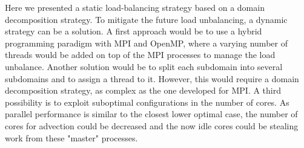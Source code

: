 Here we presented a static load-balancing strategy based on a domain
decomposition strategy. To mitigate the future load unbalancing, a dynamic
strategy can be a solution. A first approach would be to use a hybrid programming
paradigm with MPI and OpenMP, where a varying number of threads would be added
on top of the MPI processes to manage the load unbalance. Another solution would
be to split each subdomain into several subdomains and to assign a thread to it.
However, this would require a domain decomposition strategy, as complex as the
one developed for MPI. A third possibility is to exploit suboptimal
configurations in the number of cores. As parallel performance is similar to the
closest lower optimal case, the number of cores for advection could be decreased
and the now idle cores could be stealing work from these
"master" processes.
